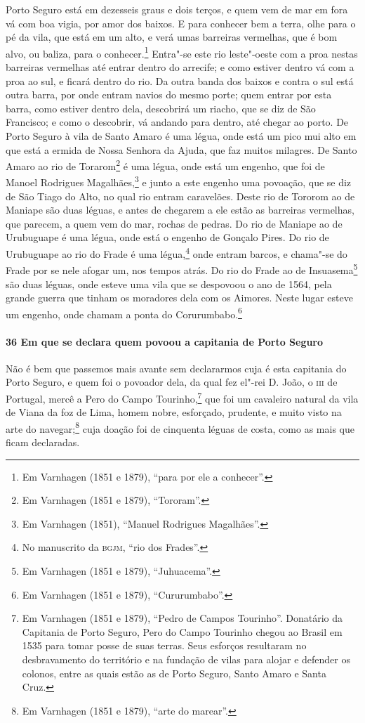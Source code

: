 Porto Seguro está em dezesseis graus e dois terços, e quem vem de mar em fora vá com boa
vigia, por amor dos baixos. E para conhecer bem a terra, olhe para o pé da vila, que está
em um alto, e verá umas barreiras vermelhas, que é bom alvo, ou baliza, para o
conhecer.\footnote{ Em Varnhagen (1851 e 1879), ``para por ele a conhecer''.} Entra"-se
este rio leste"-oeste com a proa nestas barreiras vermelhas até entrar dentro do arrecife;
e como estiver dentro vá com a proa ao sul, e ficará dentro do rio. Da outra banda dos
baixos e contra o sul está outra barra, por onde entram navios do mesmo porte; quem entrar
por esta barra, como estiver dentro dela, descobrirá um riacho, que se diz de São
Francisco; e como o descobrir, vá andando para dentro, até chegar ao porto. De Porto
Seguro à vila de Santo Amaro é uma légua, onde está um pico mui alto em que está a ermida
de Nossa Senhora da Ajuda, que faz muitos milagres. De Santo Amaro ao rio de
Torarom\footnote{ Em Varnhagen (1851 e 1879), ``Tororam''.} é uma légua, onde está um
engenho, que foi de Manoel Rodrigues Magalhães,\footnote{ Em Varnhagen (1851), ``Manuel
Rodrigues Magalhães''.} e junto a este engenho uma povoação, que se diz de São Tiago do
Alto, no qual rio entram caravelões. Deste rio de Tororom ao de Maniape são duas léguas, e
antes de chegarem a ele estão as barreiras vermelhas, que parecem, a quem vem do mar,
rochas de pedras. Do rio de Maniape ao de Urubuguape é uma légua, onde está o engenho de
Gonçalo Pires. Do rio de Urubuguape ao rio do Frade é uma légua,\footnote{ No manuscrito
da \textsc{bgjm}, ``rio dos Frades''.} onde entram barcos, e chama"-se do Frade por se nele
afogar um, nos tempos atrás. Do rio do Frade ao de Insuasema\footnote{ Em Varnhagen (1851
e 1879), ``Juhuacema''.} são duas léguas, onde esteve uma vila que se despovoou o ano de
1564, pela grande guerra que tinham os moradores dela com os Aimores. Neste lugar esteve
um engenho, onde chamam a ponta do Corurumbabo.\footnote{ Em Varnhagen (1851 e 1879),
``Cururumbabo''.}

\paragraph{36 Em que se declara quem povoou a capitania de Porto Seguro}

Não é bem que passemos mais avante sem declararmos cuja é esta capitania do Porto Seguro,
e quem foi o povoador dela, da qual fez el"-rei D. João, o \textsc{iii} de Portugal, mercê
a Pero do Campo Tourinho,\footnote{ Em Varnhagen (1851 e 1879), ``Pedro de Campos
Tourinho''. Donatário da Capitania de Porto Seguro, Pero do Campo Tourinho chegou ao
Brasil em 1535 para tomar posse de suas terras. Seus esforços resultaram no desbravamento
do território e na fundação de vilas para alojar e defender os colonos, entre as quais
estão as de Porto Seguro, Santo Amaro e Santa Cruz.} que foi um cavaleiro natural da vila
de Viana da foz de Lima, homem nobre, esforçado, prudente, e muito visto na arte do
navegar;\footnote{ Em Varnhagen (1851 e 1879), ``arte do marear''.} cuja doação foi de
cinquenta léguas de costa, como as mais que ficam declaradas.

